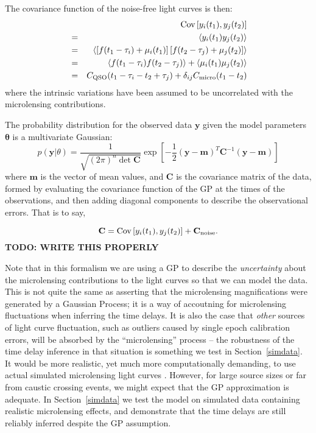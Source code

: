 \documentclass[useAMS,usenatbib, a4paper]{mn2e} \usepackage{natbib}
\begin{document}
The covariance function of the noise-free light curves is then:
\begin{eqnarray}
& & \textnormal{Cov}\left[y_i(t_1), y_j(t_2)\right] \nonumber\\
&=& \left<y_i(t_1)y_j(t_2)\right> \\
&=& \left<\left[f(t_1 - \tau_i) + \mu_i(t_1)\right]\left[f(t_2 - \tau_j) + \mu_j(t_2)\right]\right> \\
&=& \left<f(t_1 - \tau_i)f(t_2 - \tau_j)\right> + \left<\mu_i(t_1)\mu_j(t_2)\right> \\
&=& C_{\rm QSO}(t_1 - \tau_i - t_2 + \tau_j) + \delta_{ij}C_{\rm micro}(t_1 - t_2)
\end{eqnarray}
where the intrinsic variations have been assumed to be uncorrelated with the
microlensing contributions.

The probability distribution for the observed data $\mathbf{y}$ given the
model parameters $\boldsymbol{\theta}$ is a multivariate Gaussian:
\begin{equation}
p(\mathbf{y} | \theta) = \frac{1}{\sqrt{(2\pi)^n \det \mathbf{C}}} \exp\left[-\frac{1}{2}(\mathbf{y} - \mathbf{m})^T\mathbf{C}^{-1}(\mathbf{y} - \mathbf{m})\right]
\end{equation}
where $\mathbf{m}$ is the vector of mean values, and $\mathbf{C}$ is the
covariance matrix of the data, formed by evaluating the covariance function of
the GP at the times of the observations, and then adding diagonal components
to describe the observational errors. That is to say, 

\begin{equation}
\mathbf{C} = \textnormal{Cov}\left[y_i(t_1), y_j(t_2)\right] + \mathbf{C}_{\rm noise}.
\end{equation}
{\bf TODO: WRITE THIS PROPERLY}

Note that in this formalism we are using a  GP to describe the {\it
uncertainty} about the microlensing contributions to the light curves so that
we can model the data. This is not quite the same as asserting that the
microlensing magnifications were generated by a Gaussian Process; it is a way
of accoutning for microlensing fluctuations when inferring the time delays. It
is also the case that {\it other} sources of light curve fluctuation, such as
outliers caused by single epoch calibration errors, will be absorbed by the
``microlensing'' process -- the robustness of the time delay inference in that
situation is something we test in Section~\ref{simdata}. It would be more
realistic, yet much more computationally demanding, to use actual simulated
microlensing  light curves \citep{1999JCoAM.109..353W, 2008ApJ...676...80M,
2010NewA...15..181G}. However, for large source sizes or far from caustic
crossing events, we might expect that the GP approximation is adequate. In
Section~\ref{simdata} we test the model on simulated data containing realistic
microlensing effects, and demonstrate that the time delays are still reliably
inferred despite the GP assumption.
\end{document}

